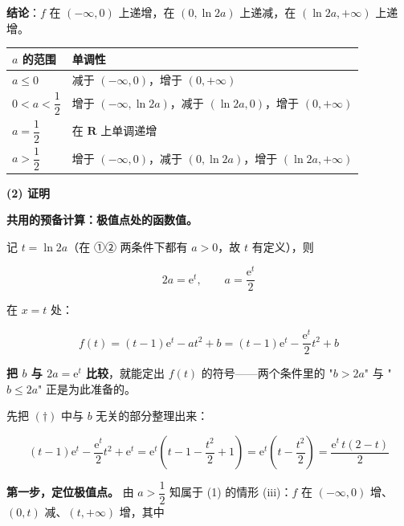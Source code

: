 \begin{answer}
\textbf{结论}：$f$ 在 $(-\infty,0)$ 上递增，在 $(0,\ln2a)$ 上递减，在 $(\ln2a,+\infty)$ 上递增。

\par\medskip


\begin{center}
\begin{tabular}{ll}
\toprule
$a$ 的范围 & 单调性 \\
\midrule
$a\le0$ & 减于 $(-\infty,0)$，增于 $(0,+\infty)$ \\
$0<a<\dfrac12$ & 增于 $(-\infty,\ln2a)$，减于 $(\ln2a,0)$，增于 $(0,+\infty)$ \\
$a=\dfrac12$ & 在 $\mathbf R$ 上单调递增 \\
$a>\dfrac12$ & 增于 $(-\infty,0)$，减于 $(0,\ln2a)$，增于 $(\ln2a,+\infty)$ \\
\bottomrule
\end{tabular}
\end{center}

\par\medskip

\textbf{(2) 证明}

\textbf{共用的预备计算：极值点处的函数值。}

记 $t=\ln2a$（在 ①② 两条件下都有 $a>0$，故 $t$ 有定义），则

\nopagebreak[4]
\[2a=\mathrm e^{t},\qquad a=\frac{\mathrm e^{t}}2\]

在 $x=t$ 处：

\nopagebreak[4]
\[f(t)=(t-1)\mathrm e^{t}-at^{2}+b=(t-1)\mathrm e^{t}-\frac{\mathrm e^{t}}2t^{2}+b\tag{$\dagger$}\]

\textbf{把 $b$ 与 $2a=\mathrm e^{t}$ 比较}，就能定出 $f(t)$ 的符号——两个条件里的 "$b>2a$" 与 "$b\le2a$" 正是为此准备的。

先把 $(\dagger)$ 中与 $b$ 无关的部分整理出来：

\nopagebreak[4]
\[(t-1)\mathrm e^{t}-\frac{\mathrm e^{t}}2t^{2}+\mathrm e^{t}=\mathrm e^{t}\left(t-1-\frac{t^{2}}2+1\right)=\mathrm e^{t}\left(t-\frac{t^{2}}2\right)=\frac{\mathrm e^{t}\,t(2-t)}2\tag{$\ddagger$}\]

\par\medskip


\textbf{第一步，定位极值点。} 由 $a>\dfrac12$ 知属于 (1) 的情形 (iii)：$f$ 在 $(-\infty,0)$ 增、$(0,t)$ 减、$(t,+\infty)$ 增，其中


\end{answer}
